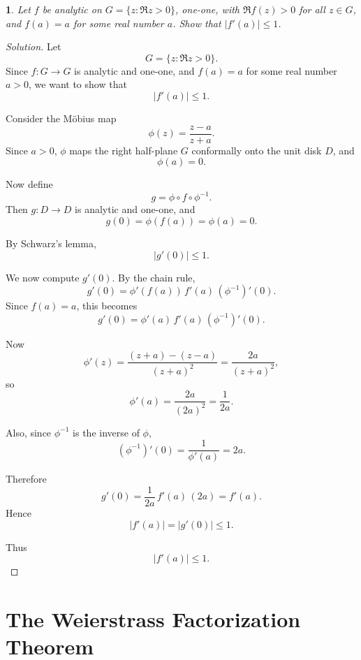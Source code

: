 \documentclass[12pt, a4paper]{report}
\theoremstyle{spaced}
\newtheorem{exercise}{}
\newcommand{\setexercise}[1]{\setcounter{exercise}{#1-1}}
\begin{document}
\setexercise{5}
\begin{exercise}
	Let $f$ be analytic on $G=\{z:\Re z>0\}$, one-one, with $\Re f(z)>0$ for all $z\in G$, and $f(a)=a$ for some real number $a$. Show that $|f'(a)|\le 1$.
\end{exercise}
\begin{proof}[Solution]
	Let
	\[
		G=\{z:\Re z>0\}.
	\]
	Since \(f:G\to G\) is analytic and one-one, and \(f(a)=a\) for some real number \(a>0\), we want to show that
	\[
		|f'(a)|\le 1.
	\]

	Consider the Möbius map
	\[
		\phi(z)=\frac{z-a}{z+a}.
	\]
	Since \(a>0\), \(\phi\) maps the right half-plane \(G\) conformally onto the unit disk \(D\), and
	\[
		\phi(a)=0.
	\]

	Now define
	\[
		g=\phi\circ f\circ \phi^{-1}.
	\]
	Then \(g:D\to D\) is analytic and one-one, and
	\[
		g(0)=\phi(f(a))=\phi(a)=0.
	\]

	By Schwarz's lemma,
	\[
		|g'(0)|\le 1.
	\]

	We now compute \(g'(0)\). By the chain rule,
	\[
		g'(0)=\phi'(f(a))\,f'(a)\,(\phi^{-1})'(0).
	\]
	Since \(f(a)=a\), this becomes
	\[
		g'(0)=\phi'(a)\,f'(a)\,(\phi^{-1})'(0).
	\]

	Now
	\[
		\phi'(z)=\frac{(z+a)-(z-a)}{(z+a)^2}=\frac{2a}{(z+a)^2},
	\]
	so
	\[
		\phi'(a)=\frac{2a}{(2a)^2}=\frac{1}{2a}.
	\]

	Also, since \(\phi^{-1}\) is the inverse of \(\phi\),
	\[
		(\phi^{-1})'(0)=\frac{1}{\phi'(a)}=2a.
	\]

	Therefore
	\[
		g'(0)=\frac{1}{2a}\,f'(a)\,(2a)=f'(a).
	\]
	Hence
	\[
		|f'(a)|=|g'(0)|\le 1.
	\]

	Thus
	\[
		|f'(a)|\le 1.
	\]
\end{proof}

\section{The Weierstrass Factorization Theorem}
\end{document}
